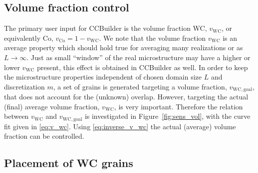 \documentclass[3p,12pt]{elsarticle}
\newcommand{\Co}{\mathrm{Co}}
\newcommand{\WC}{\mathrm{WC}}
\begin{document}
\subsection{Volume fraction control} \label{sec:volume_fraction_control}

The primary user input for CCBuilder is the volume fraction WC, $v_\WC$, or equivalently Co, $v_\Co = 1 - v_\WC$.
We note that the volume fraction $v_\WC$ is an average property which should hold true for averaging many realizations or as $L \to \infty$.
Just as small ``window'' of the real microstructure may have a higher or lower $v_\WC$ present, this effect is obtained in CCBuilder as well.
In order to keep the microstructure properties independent of chosen domain size $L$ and discretization $m$, a set of grains is generated targeting a volume fraction, $v_{\WC,\text{goal}}$, that does not account for the (unknown) overlap.
%
%
However, targeting the actual (final) average volume fraction, $v_\WC$, is very important.
Therefore the relation between $v_\WC$ and $v_{\WC,\text{goal}}$ is investigated in Figure~\ref{fig:sens_vol}, with the curve fit given in \eqref{eq:v_wc}.
Using \eqref{eq:inverse_v_wc} the actual (average) volume fraction can be controlled.


\subsection{Placement of WC grains} \label{sec:grain_placement}
\end{document}
